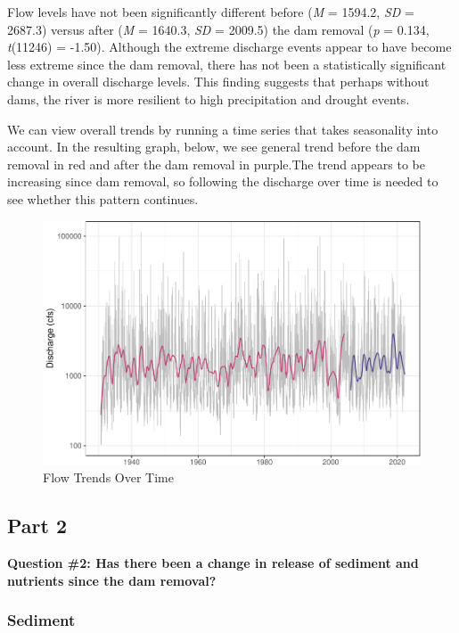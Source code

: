 \documentclass[
  12pt,
]{article}
\begin{document}
Flow levels have not been significantly different before (\emph{M} =
1594.2, \emph{SD} = 2687.3) versus after (\emph{M} = 1640.3, \emph{SD} =
2009.5) the dam removal (\emph{p} = 0.134, \emph{t}(11246) = -1.50).
Although the extreme discharge events appear to have become less extreme
since the dam removal, there has not been a statistically significant
change in overall discharge levels. This finding suggests that perhaps
without dams, the river is more resilient to high precipitation and
drought events.

\newpage

We can view overall trends by running a time series that takes
seasonality into account. In the resulting graph, below, we see general
trend before the dam removal in red and after the dam removal in
purple.The trend appears to be increasing since dam removal, so
following the discharge over time is needed to see whether this pattern
continues.

\begin{figure}
\centering
\includegraphics{Project_Script_files/figure-latex/flow_ts_graph-1.pdf}
\caption{Flow Trends Over Time}
\end{figure}

\newpage

\hypertarget{part-2}{%
\subsection{Part 2}\label{part-2}}

\textbf{Question \#2: Has there been a change in release of sediment and
nutrients since the dam removal?}

\hypertarget{sediment}{%
\subsubsection{Sediment}\label{sediment}}
\end{document}
